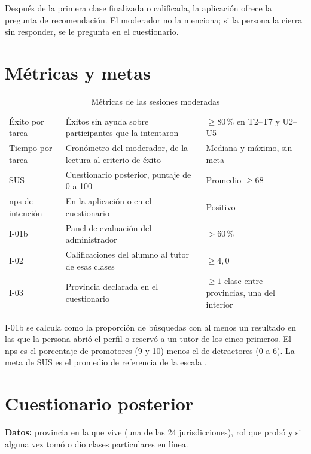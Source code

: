 Después de la primera clase finalizada o calificada, la aplicación
ofrece la pregunta de recomendación. El moderador no la menciona; si la
persona la cierra sin responder, se le pregunta en el cuestionario.

\section{Métricas y metas}

\begin{table}[H]
    \centering
    \caption{Métricas de las sesiones moderadas}
    \label{tab:metricas-sesiones}
    \small
    \begin{tabularx}{\textwidth}{L L l}
        \toprule
         &  &  \\
        \midrule
        Éxito por tarea & Éxitos sin ayuda sobre participantes que la intentaron & $\geq 80\,\%$ en T2--T7 y U2--U5 \\
        Tiempo por tarea & Cronómetro del moderador, de la lectura al criterio de éxito & Mediana y máximo, sin meta \\
        SUS & Cuestionario posterior, puntaje de 0 a 100 & Promedio $\geq 68$ \\
        \gls{nps} de intención & En la aplicación o en el cuestionario & Positivo \\
        I-01b & Panel de evaluación del administrador & $> 60\,\%$ \\
        I-02 & Calificaciones del alumno al tutor de esas clases & $\geq 4{,}0$ \\
        I-03 & Provincia declarada en el cuestionario & $\geq 1$ clase entre provincias, una del interior \\
        \bottomrule
    \end{tabularx}
\end{table}

I-01b se calcula como la proporción de búsquedas con al menos un
resultado en las que la persona abrió el perfil o reservó a un tutor de
los cinco primeros. El \gls{nps} es el porcentaje de promotores (9 y 10)
menos el de detractores (0 a 6). La meta de SUS es el promedio de
referencia de la escala \citep{sauro2011}.

\section{Cuestionario posterior}

\textbf{Datos:} provincia en la que vive (una de las 24 jurisdicciones),
rol que probó y si alguna vez tomó o dio clases particulares en línea.

